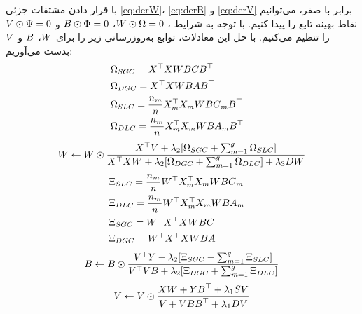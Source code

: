 با قرار دادن مشتقات جزئی \eqref{eq:derW}، \eqref{eq:derB} و \eqref{eq:derV} برابر با صفر، می‌توانیم نقاط بهینه تابع را پیدا کنیم. با توجه به شرایط 
، $\boldmath{W}\odot\boldmath{\Omega}=\boldmath{0}$، $\boldmath{B}\odot\boldmath{\Phi}=\boldmath{0}$ و $\boldmath{V}\odot\boldmath{\Psi}=\boldmath{0}$ را تنظیم می‌کنیم. با حل این معادلات، توابع به‌روزرسانی زیر را برای $\boldmath{W}$، $\boldmath{B}$ و $\boldmath{V}$ بدست می‌آوریم:‎\\
\begin{align*}
	&\boldmath{\Omega}_{SGC}=\boldmath{X}^\top \boldmath{XWBCB}^\top & \\
	&\boldmath{\Omega}_{DGC}=\boldmath{X}^\top \boldmath{XWBAB}^\top & \\
	&\boldmath{\Omega}_{SLC}=\frac{n_m}{n}\boldmath{X}^\top_m \boldmath{X}_m\boldmath{WBC}_m\boldmath{B}^\top & \\
	&\boldmath{\Omega}_{DLC}=\frac{n_m}{n}\boldmath{X}^\top_m\boldmath{X}_m\boldmath{WBA}_m\boldmath{B}^\top & \\
\end{align*}
\begin{align}\label{eq:updW}
	\boldmath{W} \leftarrow \boldmath{W} \odot \frac{\boldmath{X}^\top \boldmath{V} + \lambda_2[\boldmath{\Omega}_{SGC}+ \sum_{m=1}^{g}\boldmath{\Omega}_{SLC}]}
	{\boldmath{X}^\top \boldmath{XW} + \lambda_2[\boldmath{\Omega}_{DGC} +\sum_{m=1}^{g}\boldmath{\Omega}_{DLC}]+\lambda_3\boldmath{DW}}
\end{align}
\begin{align*}
	&\boldmath{\Xi}_{SLC}=\frac{n_m}{n}\boldmath{W}^\top \boldmath{X}^\top_m \boldmath{X}_m\boldmath{WBC}_m & \\
	&\boldmath{\Xi}_{DLC}=\frac{n_m}{n}\boldmath{W}^\top \boldmath{X}^\top_m \boldmath{X}_m\boldmath{WBA}_m & \\
	&\boldmath{\Xi}_{SGC}=\boldmath{W}^\top \boldmath{X}^\top \boldmath{XWBC} & \\
	&\boldmath{\Xi}_{DGC}=\boldmath{W}^\top \boldmath{X}^\top \boldmath{XWBA} & \\
\end{align*}
\begin{align}\label{eq:updB}
	\boldmath{B} \leftarrow \boldmath{B}\odot \frac{\boldmath{V}^\top \boldmath{Y} +\lambda_2[\boldmath{\Xi}_{SGC} +\sum_{m=1}^{g} \boldmath{\Xi}_{SLC} ]}{\boldmath{V}^\top \boldmath{VB} + \lambda_2[\boldmath{\Xi}_{DGC} +\sum_{m=1}^{g} \boldmath{\Xi}_{DLC}] }
\end{align}
\begin{align}\label{eq:updV}
	\boldmath{V} \leftarrow \boldmath{V} \odot \frac{\boldmath{XW} + \boldmath{YB}^\top + \lambda_1 \boldmath{SV}}{\boldmath{V} +\boldmath{VBB}^\top + \lambda_1 \boldmath{DV}}
\end{align}

